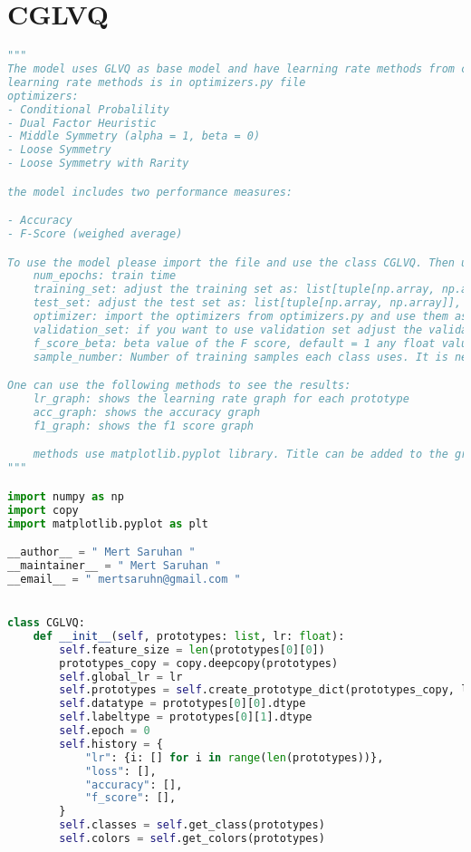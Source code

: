\section*{\hypertarget{appcglvq}{CGLVQ}}
\begin{lstlisting}[language=Python]
"""
The model uses GLVQ as base model and have learning rate methods from cognitive science
learning rate methods is in optimizers.py file
optimizers:
- Conditional Probalility
- Dual Factor Heuristic
- Middle Symmetry (alpha = 1, beta = 0)
- Loose Symmetry
- Loose Symmetry with Rarity

the model includes two performance measures:

- Accuracy
- F-Score (weighed average)

To use the model please import the file and use the class CGLVQ. Then use class method train with the following parameters:
    num_epochs: train time
    training_set: adjust the training set as: list[tuple[np.array, np.array]],
    test_set: adjust the test set as: list[tuple[np.array, np.array]],
    optimizer: import the optimizers from optimizers.py and use them as optimizer=optimizer_name,
    validation_set: if you want to use validation set adjust the validation set as: list[tuple[np.array, np.array]] = None,
    f_score_beta: beta value of the F score, default = 1 any float value can be used,
    sample_number: Number of training samples each class uses. It is needed to calculate the weighted F scores

One can use the following methods to see the results:
    lr_graph: shows the learning rate graph for each prototype
    acc_graph: shows the accuracy graph
    f1_graph: shows the f1 score graph

    methods use matplotlib.pyplot library. Title can be added to the graphs as string by adding the title in the method as parameter.
"""

import numpy as np
import copy
import matplotlib.pyplot as plt

__author__ = " Mert Saruhan "
__maintainer__ = " Mert Saruhan "
__email__ = " mertsaruhn@gmail.com "


class CGLVQ:
    def __init__(self, prototypes: list, lr: float):
        self.feature_size = len(prototypes[0][0])
        prototypes_copy = copy.deepcopy(prototypes)
        self.global_lr = lr
        self.prototypes = self.create_prototype_dict(prototypes_copy, lr)
        self.datatype = prototypes[0][0].dtype
        self.labeltype = prototypes[0][1].dtype
        self.epoch = 0
        self.history = {
            "lr": {i: [] for i in range(len(prototypes))},
            "loss": [],
            "accuracy": [],
            "f_score": [],
        }
        self.classes = self.get_class(prototypes)
        self.colors = self.get_colors(prototypes)


\end{lstlisting}
